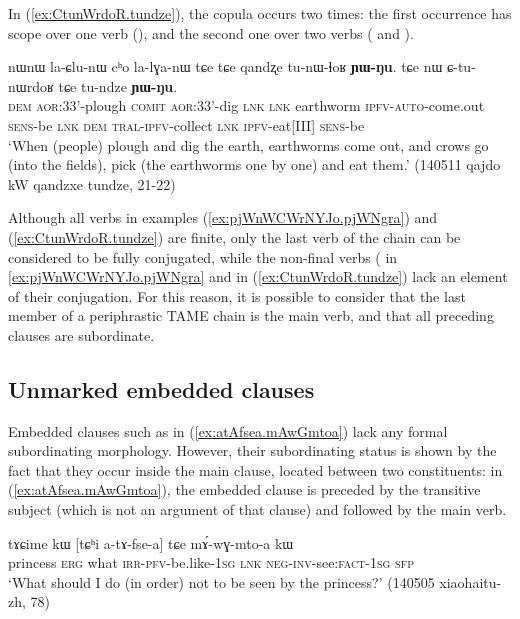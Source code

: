 In (\ref{ex:CtunWrdoR.tundze}), the copula  occurs two times: the first occurrence has scope over one verb (), and the second one over two verbs ( and ).

\begin{exe}
\ex \label{ex:CtunWrdoR.tundze}
\gll  nɯnɯ la-ɕlu-nɯ cʰo la-lɣa-nɯ tɕe tɕe qandʐe tu-nɯ-ɬoʁ \textbf{ɲɯ-ŋu}. tɕe nɯ ɕ-tu-nɯrdoʁ tɕe tu-ndze \textbf{ɲɯ-ŋu}. \\
\textsc{dem} \textsc{aor}:3\fl{}3'-plough \textsc{comit}  \textsc{aor}:3\fl{}3'-dig \textsc{lnk} \textsc{lnk} earthworm \textsc{ipfv}-\textsc{auto}-come.out \textsc{sens}-be \textsc{lnk} \textsc{dem} \textsc{tral}-\textsc{ipfv}-collect \textsc{lnk} \textsc{ipfv}-eat[III] \textsc{sens}-be \\
\glt `When (people) plough and dig the earth, earthworms come out, and crows go (into the fields), pick (the earthworms one by one) and eat them.' (140511 qajdo kW qandzxe tundze, 21-22)
\end{exe}   

Although all verbs in examples (\ref{ex:pjWnWCWrNYJo.pjWNgra}) and (\ref{ex:CtunWrdoR.tundze}) are finite, only the last verb of the chain can be considered to be fully conjugated, while the non-final verbs ( in \ref{ex:pjWnWCWrNYJo.pjWNgra} and  in (\ref{ex:CtunWrdoR.tundze}) lack an element of their conjugation. For this reason, it is possible to consider that the last member of a periphrastic TAME chain is the main verb, and that all preceding clauses are subordinate.

\subsection{Unmarked embedded clauses} \label{sec:embedded.clause}
Embedded clauses such as   in  (\ref{ex:atAfsea.mAwGmtoa}) lack any formal subordinating morphology. However, their subordinating status is shown by the fact that they occur inside the main clause, located between two constituents: in (\ref{ex:atAfsea.mAwGmtoa}), the embedded clause is preceded by the transitive subject  (which is not an argument of that clause) and followed by the main verb.


\begin{exe}
\ex \label{ex:atAfsea.mAwGmtoa}
\gll tɤɕime kɯ [tɕʰi a-tɤ-fse-a] tɕe mɤ́-wɣ-mto-a kɯ \\
princess \textsc{erg} what \textsc{irr}-\textsc{pfv}-be.like-\textsc{1sg} \textsc{lnk} \textsc{neg}-\textsc{inv}-see:\textsc{fact}-\textsc{1sg} \textsc{sfp} \\
\glt `What should I do (in order) not to be seen by the princess?' (140505 xiaohaitu-zh, 78)
\end{exe}   

